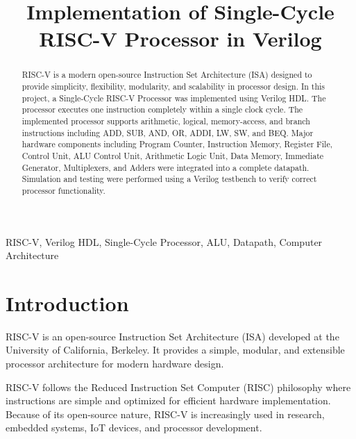 \documentclass[conference]{IEEEtran}
\begin{document}
\title{Implementation of Single-Cycle RISC-V Processor in Verilog}

\author{
}

\maketitle


\begin{abstract}
RISC-V is a modern open-source Instruction Set Architecture (ISA) designed to provide simplicity, flexibility, modularity, and scalability in processor design. In this project, a Single-Cycle RISC-V Processor was implemented using Verilog HDL. The processor executes one instruction completely within a single clock cycle. The implemented processor supports arithmetic, logical, memory-access, and branch instructions including ADD, SUB, AND, OR, ADDI, LW, SW, and BEQ. Major hardware components including Program Counter, Instruction Memory, Register File, Control Unit, ALU Control Unit, Arithmetic Logic Unit, Data Memory, Immediate Generator, Multiplexers, and Adders were integrated into a complete datapath. Simulation and testing were performed using a Verilog testbench to verify correct processor functionality.
\end{abstract}

\begin{IEEEkeywords}
RISC-V, Verilog HDL, Single-Cycle Processor, ALU, Datapath, Computer Architecture
\end{IEEEkeywords}


\section{Introduction}

RISC-V is an open-source Instruction Set Architecture (ISA) developed at the University of California, Berkeley. It provides a simple, modular, and extensible processor architecture for modern hardware design.

RISC-V follows the Reduced Instruction Set Computer (RISC) philosophy where instructions are simple and optimized for efficient hardware implementation. Because of its open-source nature, RISC-V is increasingly used in research, embedded systems, IoT devices, and processor development.
\end{document}
